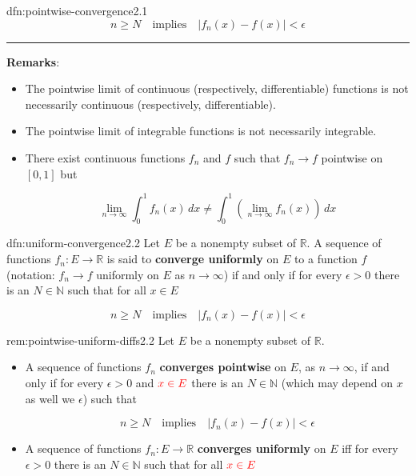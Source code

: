 \documentclass[landscape, 8pt]{extarticle}
\begin{document}
\begin{multicols}{3}
\begin{dfn}{dfn:pointwise-convergence}{2.1}
	\[n\ge N\quad\text{implies}\quad \lvert f_{n}(x)-f(x) \rvert < \epsilon\]

	\noindent\rule{\textwidth}{0.2pt}
	\textbf{Remarks}:
	\begin{itemize}
		\setlength\itemsep{0em}
		\item The pointwise limit of continuous (respectively, differentiable) functions is not necessarily continuous (respectively, differentiable).

		\item The pointwise limit of integrable functions is not necessarily integrable.

		\item There exist continuous functions $f_{n}$ and $f$ such that $f_{n}\to f$ pointwise on $[0,1]$ but

			\[\lim_{n \to \infty} \int_{0}^{1} f_{n}(x) \, dx \ne \int_{0}^{1} \left(\lim_{n \to \infty} f_{n}(x)\right) \, dx \]
	\end{itemize}

\end{dfn}


\begin{dfn}{dfn:uniform-convergence}{2.2}
	Let $E$ be a nonempty subset of $\mathbb{R}$. A sequence of functions $f_{n}: E\to\mathbb{R}$ is said to \textbf{converge uniformly} on $E$ to a function $f$ (notation: $f_{n}\to f$ uniformly on $E$ as $n\to\infty$) if and only if for every $\epsilon>0$ there is an $N \in\mathbb{N}$ such that for all $x \in E$

	\[n\ge N\quad\text{implies}\quad \lvert f_{n}(x)-f(x) \rvert <\epsilon\]
\end{dfn}


\begin{rem}{rem:pointwise-uniform-diffs}{2.2}
	Let $E$ be a nonempty subset of $\mathbb{R}$. 

	\begin{itemize}
		\setlength\itemsep{0em}
		\item A sequence of functions $f_{n}$ \textbf{converges pointwise} on $E$, as $n\to\infty$, if and only if for every $\epsilon>0$ and $\textcolor{red}{x \in E}$ there is an $N \in\mathbb{N}$ (which may depend on $x$ as well we $\epsilon$) such that

			\[n\ge N\quad\text{implies}\quad \lvert f_{n}(x)-f(x) \rvert < \epsilon\]

		\item A sequence of functions $f_{n}: E\to\mathbb{R}$ \textbf{converges uniformly} on $E$ iff for every $\epsilon>0$ there is an $N \in\mathbb{N}$ such that for all $\textcolor{red}{x \in E}$


\end{itemize}
\end{rem}
\end{multicols}
\end{document}
